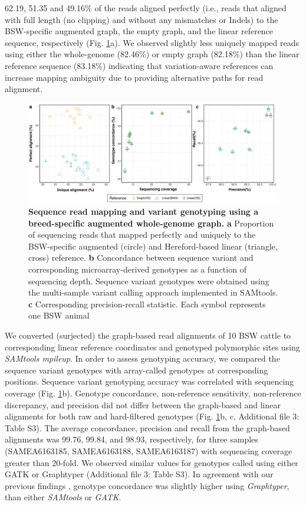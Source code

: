 \documentclass[../main.tex]{subfiles}
\begin{document}
62.19, 51.35 and 49.16\% of the reads aligned perfectly (i.e., reads that aligned with full length (no clipping) and without any mismatches or Indels) to the BSW-specific augmented graph, the empty graph, and the linear reference sequence, respectively (Fig. \ref{fig36:whole}a). We observed slightly less uniquely mapped reads using either the whole-genome (82.46\%) or empty graph (82.18\%) than the linear reference sequence (83.18\%) indicating that variation-aware references can increase mapping ambiguity due to providing alternative paths for read alignment.

\begin{figure}[!htb]
    \centering
    \includegraphics[width=\textwidth]{paper2/main_figure/Fig6.pdf}
    \caption[Variant genotyping from graphs]{\textbf{Sequence read mapping and variant genotyping using a breed-specific augmented whole-genome graph.} 
    \small{\textbf{a} Proportion of sequencing reads that mapped perfectly and uniquely to the BSW-specific augmented (circle) and Hereford-based linear (triangle, cross) reference. \textbf{b} Concordance between sequence variant and corresponding microarray-derived genotypes as a function of sequencing depth. Sequence variant genotypes were obtained using the multi-sample variant calling approach implemented in SAMtools. \textbf{c} Corresponding precision-recall statistic. Each symbol represents one BSW animal}}
    \label{fig36:whole}
\end{figure}

We converted (surjected) the graph-based read alignments of 10 BSW cattle to corresponding linear reference coordinates and genotyped polymorphic sites using \emph{SAMtools mpileup}. In order to assess genotyping accuracy, we compared the sequence variant genotypes with array-called genotypes at corresponding positions. Sequence variant genotyping accuracy was correlated with sequencing coverage (Fig. \ref{fig36:whole}b). Genotype concordance, non-reference sensitivity, non-reference discrepancy, and precision did not differ between the graph-based and linear alignments for both raw and hard-filtered genotypes (Fig. \ref{fig36:whole}b, c, Additional file 3: Table S3). The average concordance, precision and recall from the graph-based alignments was 99.76, 99.84, and 98.93, respectively, for three samples (SAMEA6163185, SAMEA6163188, SAMEA6163187) with sequencing coverage greater than 20-fold. We observed similar values for genotypes called using either GATK or Graphtyper (Additional file 3: Table S3). In agreement with our previous findings \citep{crysnanto2019accurate}, genotype concordance was slightly higher using \emph{Graphtyper}, than either \emph{SAMtools} or \emph{GATK}.
\end{document}
